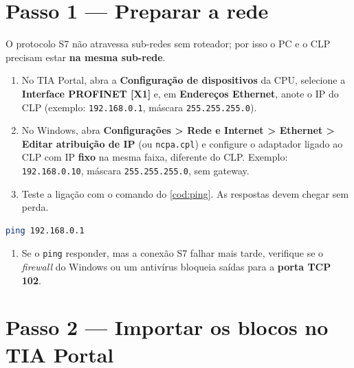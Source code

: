 \documentclass[12pt, oneside, a4paper, chapter=TITLE, section=TITLE, english, brazil]{abntex2}
\begin{document}
\chapter{Passo 1 --- Preparar a rede}

O protocolo S7 não atravessa sub-redes sem roteador; por isso o PC e o CLP precisam estar \textbf{na mesma sub-rede}.

\begin{enumerate}[label=\arabic*.]
  \item No TIA Portal, abra a \textbf{Configuração de dispositivos} da CPU, selecione a \textbf{Interface PROFINET [X1]} e, em \textbf{Endereços Ethernet}, anote o IP do CLP (exemplo: \texttt{192.168.0.1}, máscara \texttt{255.255.255.0}).
  \item No Windows, abra \textbf{Configurações > Rede e Internet > Ethernet > Editar atribuição de IP} (ou \texttt{ncpa.cpl}) e configure o adaptador ligado ao CLP com IP \textbf{fixo} na mesma faixa, diferente do CLP. Exemplo: \texttt{192.168.0.10}, máscara \texttt{255.255.255.0}, sem gateway.
  \item Teste a ligação com o comando do \autoref{cod:ping}. As respostas devem chegar sem perda.
\end{enumerate}

\begin{lstlisting}[language=bash, caption={Teste de alcance do CLP}, label={cod:ping}]
ping 192.168.0.1
\end{lstlisting}

\begin{enumerate}[label=\arabic*., resume]
  \item Se o \texttt{ping} responder, mas a conexão S7 falhar mais tarde, verifique se o \emph{firewall} do Windows ou um antivírus bloqueia saídas para a \textbf{porta TCP 102}.
\end{enumerate}

\chapter{Passo 2 --- Importar os blocos no TIA Portal}
\end{document}
